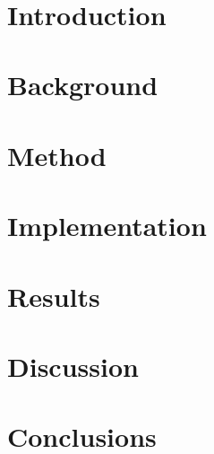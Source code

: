 \documentclass[en, openany, final, 12pt, oneside]{mgr}
\title{ }
\author{ }
\begin{document}



\tableofcontents
\chapter{Introduction}

\chapter{Background}

\chapter{Method}

\chapter{Implementation}

\chapter{Results}

\chapter{Discussion}

\chapter{Conclusions}


\cleardoublepage
{}

\end{document}
